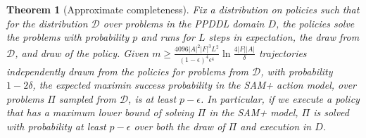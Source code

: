 \documentclass[letterpaper]{article} %
\newtheorem{theorem}{Theorem}
\begin{document}
\begin{theorem}[Approximate completeness]
\label{thm:sam-ac}
Fix a distribution on policies such that for the distribution $\mathcal{D}$ over problems 
in the PPDDL domain $D$, the policies solve the problems with probability $p$ and runs for $L$ steps in expectation, the draw from $\mathcal{D}$, and draw of the policy.
Given 
$
m\geq \frac{4096|A|^2|F|^3L^2}{(1-\epsilon)^4\epsilon^4}\ln\frac{4|F||A|}{\delta}
$
trajectories independently drawn from the policies for problems from $\mathcal{D}$, 
with probability $1-2\delta$, the expected maximin success probability in the SAM+ action model, over problems $\Pi$ sampled from $\mathcal{D}$, is at least $p-\epsilon$. In particular, if we execute a policy that has a maximum lower bound of solving $\Pi$ in the SAM+ model, 
$\Pi$ is solved with probability at least $p-\epsilon$ over both the draw of $\Pi$ and execution in $D$.
\end{theorem}

\end{document}
